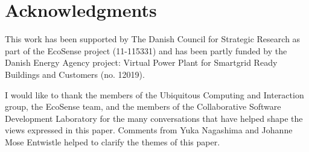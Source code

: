 \documentclass{sigchi}
\newcommand\tabhead[1]{\small\textbf{#1}}
\begin{document}
\section{Acknowledgments}

This work has been supported by The Danish Council for Strategic Research as part of the EcoSense project (11-115331) and has been partly funded by the Danish Energy Agency project: Virtual Power Plant for Smartgrid Ready Buildings and Customers (no. 12019).

I would like to thank the members of the Ubiquitous Computing and Interaction group, the EcoSense team, and the members of the Collaborative Software Development Laboratory for the many conversations that have helped shape the views expressed in this paper. Comments from Yuka Nagashima and Johanne Mose Entwistle helped to clarify the themes of this paper.






%
%
%
%
%
\balance



\end{document}
